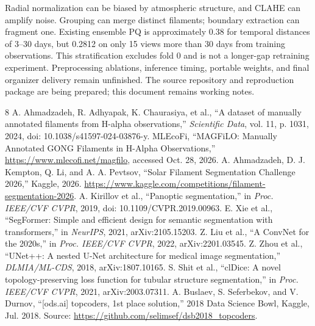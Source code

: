 \documentclass[conference]{IEEEtran}
\begin{document}
Radial normalization can be biased by atmospheric structure, and CLAHE can amplify noise. Grouping can merge distinct filaments; boundary extraction can fragment one. Existing ensemble PQ is approximately 0.38 for temporal distances of 3--30 days, but 0.2812 on only 15 views more than 30 days from training observations. This stratification excludes fold 0 and is not a longer-gap retraining experiment. Preprocessing ablations, inference timing, portable weights, and final organizer delivery remain unfinished. The source repository and reproduction package are being prepared; this document remains working notes.

\begin{thebibliography}{8}
 A. Ahmadzadeh, R. Adhyapak, K. Chaurasiya, et al., ``A dataset of manually annotated filaments from H-alpha observations,'' \emph{Scientific Data}, vol. 11, p. 1031, 2024, doi: 10.1038/s41597-024-03876-y.
 MLEcoFi, ``MAGFiLO: Manually Annotated GONG Filaments in H-Alpha Observations,'' \url{https://www.mlecofi.net/magfilo}, accessed Oct. 28, 2026.
 A. Ahmadzadeh, D. J. Kempton, Q. Li, and A. A. Pevtsov, ``Solar Filament Segmentation Challenge 2026,'' Kaggle, 2026. \url{https://www.kaggle.com/competitions/filament-segmentation-2026}.
 A. Kirillov et al., ``Panoptic segmentation,'' in \emph{Proc. IEEE/CVF CVPR}, 2019, doi: 10.1109/CVPR.2019.00963.
 E. Xie et al., ``SegFormer: Simple and efficient design for semantic segmentation with transformers,'' in \emph{NeurIPS}, 2021, arXiv:2105.15203.
 Z. Liu et al., ``A ConvNet for the 2020s,'' in \emph{Proc. IEEE/CVF CVPR}, 2022, arXiv:2201.03545.
 Z. Zhou et al., ``UNet++: A nested U-Net architecture for medical image segmentation,'' \emph{DLMIA/ML-CDS}, 2018, arXiv:1807.10165.
 S. Shit et al., ``clDice: A novel topology-preserving loss function for tubular structure segmentation,'' in \emph{Proc. IEEE/CVF CVPR}, 2021, arXiv:2003.07311.
 A. Buslaev, S. Seferbekov, and V. Durnov, ``[ods.ai] topcoders, 1st place solution,'' 2018 Data Science Bowl, Kaggle, Jul. 2018. Source: \url{https://github.com/selimsef/dsb2018_topcoders}.
\end{thebibliography}
\end{document}
